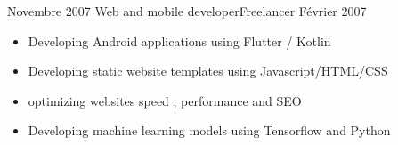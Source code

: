 %
%
%

\begin{experiences}

                        
  \experience
  {Novembre 2007}  { Web and mobile developer}{Freelancer}{}
  {Février 2007}   {
                      \begin{itemize}
                        \item {Developing Android  applications using Flutter / Kotlin}
                        \item {Developing static website templates using Javascript/HTML/CSS}
                        \item {optimizing websites speed , performance and SEO}
                        \item {Developing machine learning models using Tensorflow and Python}                     
                      \end{itemize}
                  }
                  {}  
\end{experiences}
